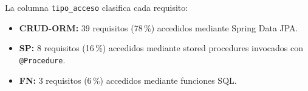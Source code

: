 La columna \texttt{tipo\_acceso} clasifica cada requisito:
\begin{itemize}
  \item \textbf{CRUD-ORM:} 39 requisitos (78\,\%) accedidos mediante Spring Data JPA.
  \item \textbf{SP:} 8 requisitos (16\,\%) accedidos mediante stored procedures invocados con \texttt{@Procedure}.
  \item \textbf{FN:} 3 requisitos (6\,\%) accedidos mediante funciones SQL.
\end{itemize}
